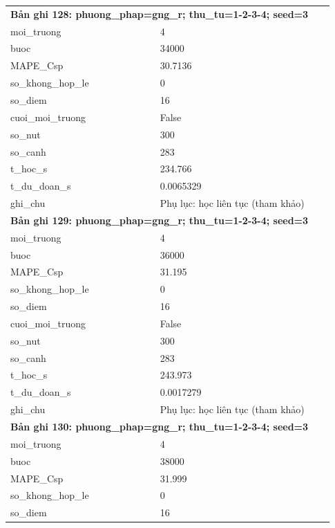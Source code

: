 \begin{longtable}{p{0.43\linewidth}p{0.50\linewidth}}
\midrule
\multicolumn{2}{p{0.95\linewidth}}{\textbf{Bản ghi 128: phuong\_phap=gng\_r; thu\_tu=1-2-3-4; seed=3}} \\
moi\_\allowbreak truong & 4 \\
buoc & 34000 \\
MAPE\_\allowbreak Csp & 30.7136 \\
so\_\allowbreak khong\_\allowbreak hop\_\allowbreak le & 0 \\
so\_\allowbreak diem & 16 \\
cuoi\_\allowbreak moi\_\allowbreak truong & False \\
so\_\allowbreak nut & 300 \\
so\_\allowbreak canh & 283 \\
t\_\allowbreak hoc\_\allowbreak s & 234.766 \\
t\_\allowbreak du\_\allowbreak doan\_\allowbreak s & 0.0065329 \\
ghi\_\allowbreak chu & Phụ lục: học liên tục (tham khảo) \\
\midrule
\multicolumn{2}{p{0.95\linewidth}}{\textbf{Bản ghi 129: phuong\_phap=gng\_r; thu\_tu=1-2-3-4; seed=3}} \\
moi\_\allowbreak truong & 4 \\
buoc & 36000 \\
MAPE\_\allowbreak Csp & 31.195 \\
so\_\allowbreak khong\_\allowbreak hop\_\allowbreak le & 0 \\
so\_\allowbreak diem & 16 \\
cuoi\_\allowbreak moi\_\allowbreak truong & False \\
so\_\allowbreak nut & 300 \\
so\_\allowbreak canh & 283 \\
t\_\allowbreak hoc\_\allowbreak s & 243.973 \\
t\_\allowbreak du\_\allowbreak doan\_\allowbreak s & 0.0017279 \\
ghi\_\allowbreak chu & Phụ lục: học liên tục (tham khảo) \\
\midrule
\multicolumn{2}{p{0.95\linewidth}}{\textbf{Bản ghi 130: phuong\_phap=gng\_r; thu\_tu=1-2-3-4; seed=3}} \\
moi\_\allowbreak truong & 4 \\
buoc & 38000 \\
MAPE\_\allowbreak Csp & 31.999 \\
so\_\allowbreak khong\_\allowbreak hop\_\allowbreak le & 0 \\
so\_\allowbreak diem & 16 \\

\end{longtable}

